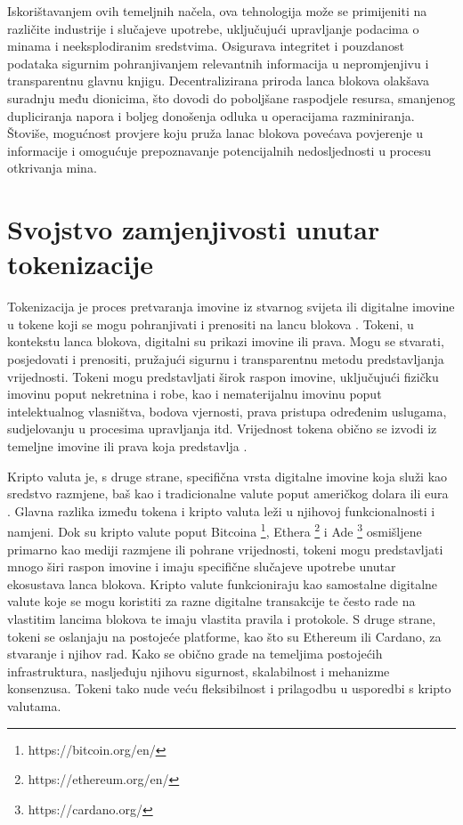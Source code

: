 \documentclass[times, utf8, diplomski]{fer}
\begin{document}
Iskorištavanjem ovih temeljnih načela, ova tehnologija može se primijeniti na različite industrije i slučajeve upotrebe, uključujući upravljanje podacima o minama i neeksplodiranim sredstvima. Osigurava integritet i pouzdanost podataka sigurnim pohranjivanjem relevantnih informacija u nepromjenjivu i transparentnu glavnu knjigu. Decentralizirana priroda lanca blokova olakšava suradnju među dionicima, što dovodi do poboljšane raspodjele resursa, smanjenog dupliciranja napora i boljeg donošenja odluka u operacijama razminiranja. Štoviše, mogućnost provjere koju pruža lanac blokova povećava povjerenje u informacije i omogućuje prepoznavanje potencijalnih nedosljednosti u procesu otkrivanja mina.

\section{Svojstvo zamjenjivosti unutar tokenizacije}

Tokenizacija je proces pretvaranja imovine iz stvarnog svijeta ili digitalne imovine u tokene koji se mogu pohranjivati i prenositi na lancu blokova \cite{buterin2014daos}. Tokeni, u kontekstu lanca blokova, digitalni su prikazi imovine ili prava. Mogu se stvarati, posjedovati i prenositi, pružajući sigurnu i transparentnu metodu predstavljanja vrijednosti. Tokeni mogu predstavljati širok raspon imovine, uključujući fizičku imovinu poput nekretnina i robe, kao i nematerijalnu imovinu poput intelektualnog vlasništva, bodova vjernosti, prava pristupa određenim uslugama, sudjelovanju u procesima upravljanja itd. Vrijednost tokena obično se izvodi iz temeljne imovine ili prava koja predstavlja \cite{buterin2014daos}.

Kripto valuta je, s druge strane, specifična vrsta digitalne imovine koja služi kao sredstvo razmjene, baš kao i tradicionalne valute poput američkog dolara ili eura \cite{zohar2015bitcoin}. Glavna razlika između tokena i kripto valuta leži u njihovoj funkcionalnosti i namjeni. Dok su kripto valute poput Bitcoina \footnote{https://bitcoin.org/en/}, Ethera \footnote{https://ethereum.org/en/} i Ade \footnote{https://cardano.org/} osmišljene primarno kao mediji razmjene ili pohrane vrijednosti, tokeni mogu predstavljati mnogo širi raspon imovine i imaju specifične slučajeve upotrebe unutar ekosustava lanca blokova. Kripto valute funkcioniraju kao samostalne digitalne valute koje se mogu koristiti za razne digitalne transakcije te često rade na vlastitim lancima blokova te imaju vlastita pravila i protokole. S druge strane, tokeni se oslanjaju na postojeće platforme, kao što su Ethereum ili Cardano, za stvaranje i njihov rad. Kako se obično grade na temeljima postojećih infrastruktura, nasljeđuju njihovu sigurnost, skalabilnost i mehanizme konsenzusa. Tokeni tako nude veću fleksibilnost i prilagodbu u usporedbi s kripto valutama.
\end{document}
